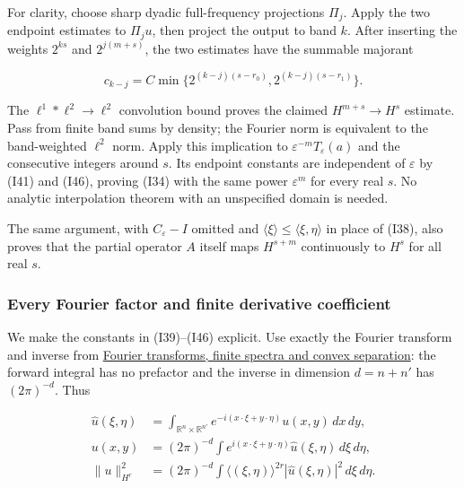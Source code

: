 \documentclass[
  11pt,
]{article}
\makeatletter
\let\ReaderOriginalAnchorStart\hyper@anchorstart
\let\ReaderOriginalAnchorEnd\hyper@anchorend
\let\ReaderPendingAliases\@empty
\def\ReaderArmAliases#1{\gdef\ReaderPendingAliases{#1}}
\def\hyper@anchorstart#1{\ReaderIfNativeAnchorTF{#1}{\ReaderPendingAliases\global\let\ReaderPendingAliases\@empty}{}\ReaderOriginalAnchorStart{#1}}
\makeatother
\begin{document}
For clarity, choose sharp dyadic full-frequency projections \(\Pi_j\).
Apply the two endpoint estimates to \(\Pi_j u\), then project the output
to band \(k\). After inserting the weights \(2^{ks}\) and
\(2^{j(m+s)}\), the two estimates have the summable majorant

\[
 c_{k-j}=C\min\{2^{(k-j)(s-r_0)},
                         2^{(k-j)(s-r_1)}\}.
 \tag{I47}
\]

The \(\ell^1*\ell^2\to\ell^2\) convolution bound proves the claimed
\(H^{m+s}\to H^s\) estimate. Pass from finite band sums by density; the
Fourier norm is equivalent to the band-weighted \(\ell^2\) norm. Apply
this implication to \(\varepsilon^{-m}T_\varepsilon(a)\) and the
consecutive integers around \(s\). Its endpoint constants are
independent of \(\varepsilon\) by (I41) and (I46), proving (I34) with
the same power \(\varepsilon^m\) for every real \(s\). No analytic
interpolation theorem with an unspecified domain is needed.

The same argument, with \(C_\varepsilon-I\) omitted and
\(\langle\xi\rangle\leq\langle\xi,\eta\rangle\) in place of (I38), also
proves that the partial operator \(A\) itself maps \(H^{s+m}\)
continuously to \(H^s\) for all real \(s\).

\ReaderArmAliases{\ReaderOriginalAnchorStart{AN03-GSI-FC-001}\ReaderOriginalAnchorEnd\begingroup\expandafter\def\csname @currentHref\endcsname{AN03-GSI-FC-001}\label{AN03-GSI-FC-001}\endgroup\ReaderOriginalAnchorStart{every-fourier-factor-and-finite-derivative-coefficient}\ReaderOriginalAnchorEnd}
\subsubsection{Every Fourier factor and finite derivative
coefficient}\label{every-fourier-factor-and-finite-derivative-coefficient}

We make the constants in (I39)--(I46) explicit. Use exactly the Fourier
transform and inverse from \href{prerequisite-bridges.pdf}{Fourier
transforms, finite spectra and convex separation}: the forward integral
has no prefactor and the inverse in dimension \(d=n+n'\) has
\((2\pi)^{-d}\). Thus

\[
 \begin{aligned}
 \widehat u(\xi,\eta)&=\int_{\mathbb R^n\times\mathbb R^{n'}}
   e^{-i(x\cdot\xi+y\cdot\eta)}u(x,y)\,dx\,dy,\\
 u(x,y)&=(2\pi)^{-d}\int
   e^{i(x\cdot\xi+y\cdot\eta)}\widehat u(\xi,\eta)\,d\xi\,d\eta,\\
 \|u\|_{H^r}^2&=(2\pi)^{-d}\int
       \langle(\xi,\eta)\rangle^{2r}|\widehat u(\xi,\eta)|^2
                    \,d\xi\,d\eta.
 \end{aligned}
 \tag{FC1}
\]
\end{document}

